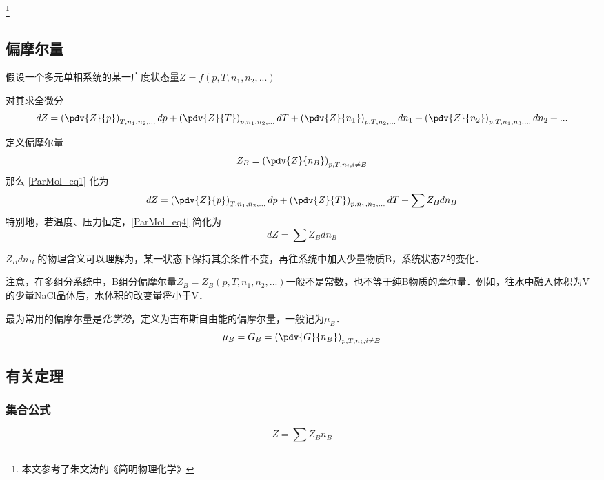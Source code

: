 \footnote{本文参考了朱文涛的《简明物理化学》}

\subsection{偏摩尔量}
假设一个多元单相系统的某一广度状态量$Z=f(p,T,n_1,n_2,...)$

对其求全微分
\begin{equation}\label{ParMol_eq1}
dZ = \left(\pdv{Z}{p}\right)_{T,n_1,n_2,...}dp + \left(\pdv{Z}{T}\right)_{p,n_1,n_2,...}dT+\left(\pdv{Z}{n_1}\right)_{p,T,n_2,...}dn_1+\left(\pdv{Z}{n_2}\right)_{p,T,n_1,n_3,...}dn_2+...
\end{equation}

定义偏摩尔量
\begin{equation}
{Z_B} = \left(\pdv{Z}{n_B}\right)_{p,T,n_i, i \neq B} 
\end{equation}
那么 \autoref{ParMol_eq1} 化为 
\begin{equation}\label{ParMol_eq4}
dZ = \left(\pdv{Z}{p}\right)_{T,n_1,n_2,...}dp + \left(\pdv{Z}{T}\right)_{p,n_1,n_2,...}dT+\sum {Z_B} dn_B
\end{equation}
特别地，若温度、压力恒定，\autoref{ParMol_eq4} 简化为
\begin{equation}\label{ParMol_eq3}
dZ = \sum {Z_B} dn_B
\end{equation}

${Z_B} d n_B$ 的物理含义可以理解为，某一状态下保持其余条件不变，再往系统中加入少量物质B，系统状态Z的变化．

注意，在多组分系统中，B组分偏摩尔量${Z_B}={Z_B}(p,T,n_1,n_2,...)$一般不是常数，也不等于纯B物质的摩尔量．例如，往水中融入体积为V的少量NaCl晶体后，水体积的改变量将小于V．

最为常用的偏摩尔量是\textsl{化学势}，定义为吉布斯自由能的偏摩尔量，一般记为$\mu_B$．
\begin{equation}
\mu_B={G_B} = \left(\pdv{G}{n_B}\right)_{p,T,n_i, i \neq B} 
\end{equation}

\subsection{有关定理}
\subsubsection{集合公式}
\begin{equation}\label{ParMol_eq2}
Z=\sum {Z_B}  n_B
\end{equation}

